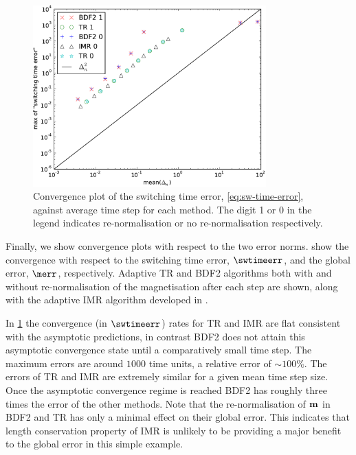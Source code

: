 \begin{figure}
  \centering
  \includegraphics[width=0.8\textwidth]{plots/ode_llg_adaptive_convergence/maxofswitchingtimeerrorvsmeanofdts}
  \caption{Convergence plot of the switching time error, \cref{eq:sw-time-error}, against average time step for each method.
    The digit 1 or 0 in the legend indicates re-normalisation or no re-normalisation respectively.
}
  \label{fig:llg-ode-convergence-swtime}
\end{figure}


Finally, we show convergence plots with respect to the two error norms.
 show the convergence with respect to the switching time error, $\swtimeerr$, and the global error, $\merr$, respectively.
Adaptive TR and BDF2 algorithms both with and without re-normalisation of the magnetisation after
each step are shown, along with the adaptive IMR algorithm developed in .


In \cref{fig:llg-ode-convergence-swtime} the convergence (in $\swtimeerr$) rates for TR and IMR are flat consistent with the asymptotic predictions, in contrast BDF2 does not attain this asymptotic convergence state until a comparatively small time step.
The maximum errors are around $1000$ time units, a relative error of $\sim 100\%$.
The errors of TR and IMR are extremely similar for a given mean time step size.
Once the asymptotic convergence regime is reached BDF2 has roughly three times the error of the other methods.
Note that the re-normalisation of $\boldsymbol{\mathrm{m}}$ in BDF2 and TR has only a minimal effect on their global error.
This indicates that length conservation property of IMR is unlikely to be providing a major benefit to the global error in this simple example.


